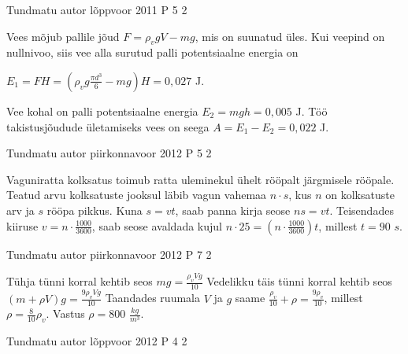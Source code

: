 \documentclass[11pt]{article}
\begin{document}
{%
{Tundmatu autor} %
{lõppvoor} %
{2011} %
{P 5} %
{2} %
{

\ifSolution
Vees mõjub pallile jõud $F = \rho_vgV − mg$, mis on suunatud üles. Kui veepind on nullnivoo, siis vee alla surutud palli potentsiaalne energia on
\begin{center}
$E_1 = FH =  (\rho_vg \frac{\pi d^3}{6} - mg) H = 0,027$ J.
\end{center}
Vee kohal on palli potentsiaalne energia $E_2 = mgh = 0,005$ J. Töö takistusjõudude ületamiseks vees on seega $A = E_1 - E_2 = 0,022$ J.
\fi
}

{Tundmatu autor} %
{piirkonnavoor} %
{2012} %
{P 5} %
{2} %
{

\ifSolution

Vaguniratta kolksatus toimub ratta uleminekul ühelt rööpalt järgmisele rööpale. Teatud arvu kolksatuste jooksul läbib vagun vahemaa $n \cdot s$, kus $n$ on kolksatuste arv ja $s$ rööpa pikkus. Kuna $s = vt$, saab panna kirja seose $ns = vt$. Teisendades kiiruse $v = n \cdot \frac{1000}{3600}$, saab seose avaldada kujul $n \cdot 25 = (n \cdot \frac{1000}{3600})t$, millest $t = 90$ $s$.
\fi
}


{Tundmatu autor} %
{piirkonnavoor} %
{2012} %
{P 7} %
{2} %
{

\ifSolution
Tühja tünni korral kehtib seos $mg = \frac {\rho_v V g}{10}$
\newline
Vedelikku täis tünni korral kehtib seos $(m + \rho V)g = \frac{9 \rho_v V g}{10}$
\newline
Taandades ruumala $V$ ja $g$ saame $\frac{\rho_v}{10} + \rho = \frac{9\rho_v}{10}$, millest $\rho = \frac{8}{10}\rho_v$.
\newline
Vastus $\rho = 800$ $\frac{kg}{m^3}$.
\fi
}

{Tundmatu autor} %
{lõppvoor} %
{2012} %
{P 4} %
{2} %
{

}}
\end{document}
